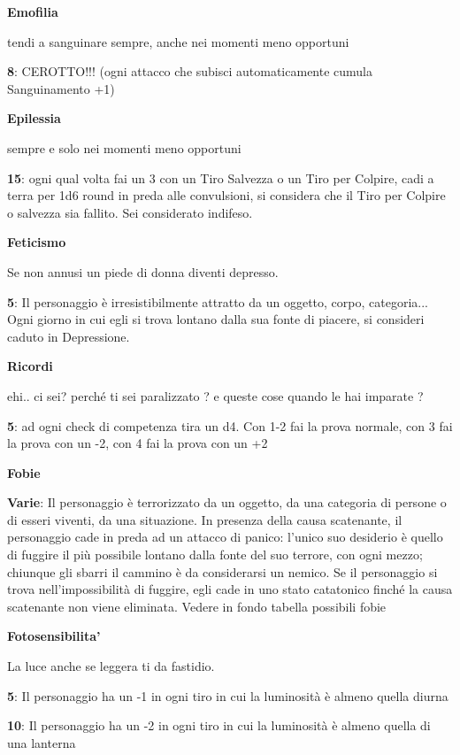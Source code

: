 \documentclass[a4paper,11pt,twoside,openany]{book}
\begin{document}
\textbf{Emofilia}

tendi a sanguinare sempre, anche nei momenti meno opportuni

\textbf{8}: CEROTTO!!! (ogni attacco che subisci automaticamente cumula Sanguinamento +1)

\textbf{Epilessia}

sempre e solo nei momenti meno opportuni

\textbf{15}: ogni qual volta fai un 3 con un Tiro Salvezza o un Tiro per Colpire, cadi a terra per 1d6 round in preda alle convulsioni, si considera che il Tiro per Colpire o salvezza sia fallito. Sei considerato indifeso.

\textbf{Feticismo}

Se non annusi un piede di donna diventi depresso.

\textbf{5}: Il personaggio è irresistibilmente attratto da un oggetto, corpo, categoria... Ogni giorno in cui egli si trova lontano dalla sua fonte di piacere, si consideri caduto in Depressione.

\textbf{Ricordi}

ehi.. ci sei? perché ti sei paralizzato ? e queste cose quando le hai imparate ?

\textbf{5}: ad ogni check di competenza tira un d4. Con 1-2 fai la prova normale, con 3 fai la prova con un -2, con 4 fai la prova con un +2

\textbf{Fobie}

\textbf{Varie}: Il personaggio è terrorizzato da un oggetto, da una categoria di persone o di esseri viventi, da una situazione. In presenza della causa scatenante, il personaggio cade in preda ad un attacco di panico: l'unico suo desiderio è quello di fuggire il più possibile lontano dalla fonte del suo terrore, con ogni mezzo; chiunque gli sbarri il cammino è da considerarsi un nemico. Se il personaggio si trova nell'impossibilità di fuggire, egli cade in uno stato catatonico finché la causa scatenante non viene eliminata. Vedere in fondo tabella possibili fobie

\textbf{Fotosensibilita'}

La luce anche se leggera ti da fastidio.

\textbf{5}: Il personaggio ha un -1 in ogni tiro in cui la luminosità è almeno quella diurna

\textbf{10}: Il personaggio ha un -2 in ogni tiro in cui la luminosità è almeno quella di una lanterna
\end{document}
